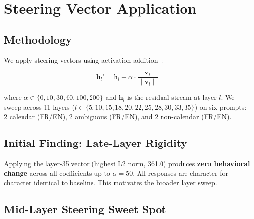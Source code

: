 \documentclass[11pt,a4paper]{article}
\begin{document}
\section{Steering Vector Application}
\label{sec:steering}

\subsection{Methodology}

We apply steering vectors using activation addition~\cite{turner2023activation}:

$$\mathbf{h}_l' = \mathbf{h}_l + \alpha \cdot \frac{\mathbf{v}_l}{\|\mathbf{v}_l\|}$$

where $\alpha \in \{0, 10, 30, 60, 100, 200\}$ and $\mathbf{h}_l$ is the residual stream at layer $l$. We sweep across 11 layers ($l \in \{5, 10, 15, 18, 20, 22, 25, 28, 30, 33, 35\}$) on six prompts: 2 calendar (FR/EN), 2 ambiguous (FR/EN), and 2 non-calendar (FR/EN).

\subsection{Initial Finding: Late-Layer Rigidity}

Applying the layer-35 vector (highest L2 norm, 361.0) produces \textbf{zero behavioral change} across all coefficients up to $\alpha=50$. All responses are character-for-character identical to baseline. This motivates the broader layer sweep.

\subsection{Mid-Layer Steering Sweet Spot}
\end{document}
